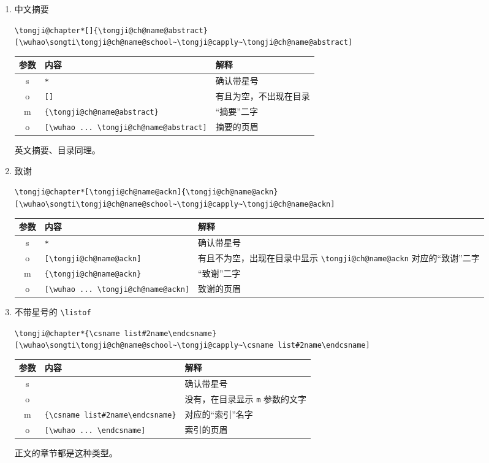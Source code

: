 \documentclass[../Main/thesis.tex]{subfiles}
\begin{document}
\begin{enumerate}
\def\labelenumi{\arabic{enumi}.}
\item
  中文摘要

  \texttt{\textbackslash{}tongji@chapter*{[}{]}\{\textbackslash{}tongji@ch@name@abstract\}{[}\textbackslash{}wuhao\textbackslash{}songti\textbackslash{}tongji@ch@name@school\textasciitilde{}\textbackslash{}tongji@capply\textasciitilde{}\textbackslash{}tongji@ch@name@abstract{]}}

  \begin{longtable}[]{@{}cll@{}}
  \toprule
  参数 & 内容 & 解释\tabularnewline
  \midrule
  \endhead
  s & \texttt{*} & 确认带星号\tabularnewline
  o & \texttt{{[}{]}} & 有且为空，不出现在目录\tabularnewline
  m & \texttt{\{\textbackslash{}tongji@ch@name@abstract\}} &
  ``摘要''二字\tabularnewline
  o &
  \texttt{{[}\textbackslash{}wuhao\ ...\ \textbackslash{}tongji@ch@name@abstract{]}}
  & 摘要的页眉\tabularnewline
  \bottomrule
  \end{longtable}

  英文摘要、目录同理。
\item
  致谢

  \texttt{\textbackslash{}tongji@chapter*{[}\textbackslash{}tongji@ch@name@ackn{]}\{\textbackslash{}tongji@ch@name@ackn\}{[}\textbackslash{}wuhao\textbackslash{}songti\textbackslash{}tongji@ch@name@school\textasciitilde{}\textbackslash{}tongji@capply\textasciitilde{}\textbackslash{}tongji@ch@name@ackn{]}}

  \begin{longtable}[]{@{}cll@{}}
  \toprule
  参数 & 内容 & 解释\tabularnewline
  \midrule
  \endhead
  s & \texttt{*} & 确认带星号\tabularnewline
  o & \texttt{{[}\textbackslash{}tongji@ch@name@ackn{]}} &
  有且不为空，出现在目录中显示 \texttt{\textbackslash{}tongji@ch@name@ackn}
  对应的``致谢''二字\tabularnewline
  m & \texttt{\{\textbackslash{}tongji@ch@name@ackn\}} &
  ``致谢''二字\tabularnewline
  o &
  \texttt{{[}\textbackslash{}wuhao\ ...\ \textbackslash{}tongji@ch@name@ackn{]}}
  & 致谢的页眉\tabularnewline
  \bottomrule
  \end{longtable}
\item
  不带星号的 \texttt{\textbackslash{}listof}

  \texttt{\textbackslash{}tongji@chapter*\{\textbackslash{}csname\ list\#2name\textbackslash{}endcsname\}{[}\textbackslash{}wuhao\textbackslash{}songti\textbackslash{}tongji@ch@name@school\textasciitilde{}\textbackslash{}tongji@capply\textasciitilde{}\textbackslash{}csname\ list\#2name\textbackslash{}endcsname{]}}

  \begin{longtable}[]{@{}cll@{}}
  \toprule
  参数 & 内容 & 解释\tabularnewline
  \midrule
  \endhead
  s & & 确认带星号\tabularnewline
  o & & 没有，在目录显示 \texttt{m} 参数的文字\tabularnewline
  m &
  \texttt{\{\textbackslash{}csname\ list\#2name\textbackslash{}endcsname\}}
  & 对应的``索引''名字\tabularnewline
  o &
  \texttt{{[}\textbackslash{}wuhao\ ...\ \textbackslash{}endcsname{]}} &
  索引的页眉\tabularnewline
  \bottomrule
  \end{longtable}

  正文的章节都是这种类型。
\end{enumerate}
\end{document}
